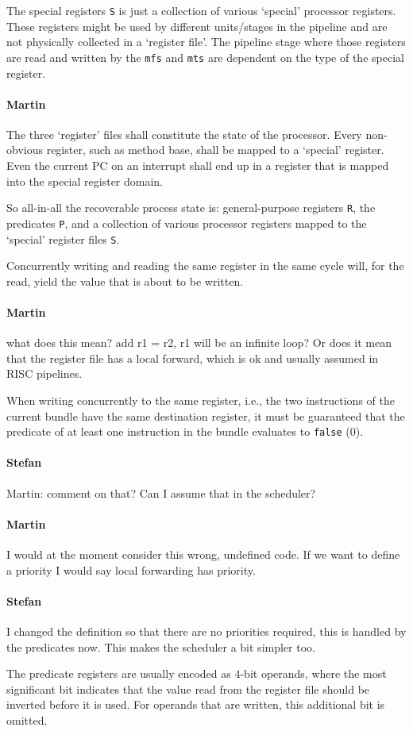 \documentclass{IEEEtran}
\newcommand{\code}[1]{{\texttt{#1}}}
\newcommand{\comment}[3]{\paragraph*{\textbf{#1}}{\color{#3}#2}}
\newcommand{\martin}[1]{\comment{Martin}{#1}{Blue}}
\newcommand{\stefan}[1]{\comment{Stefan}{#1}{RoyalPurple}}
\begin{document}
The special registers \code{S} is just a collection of various `special'
processor registers. These registers might be used by different units/stages
in the pipeline and are not physically collected in a `register file'.
The pipeline stage where those registers are read and written by the
\code{mfs} and \code{mts} are dependent on the type of the special
register.

\martin{The three `register' files shall constitute the state of the processor.
Every non-obvious register, such as method base, shall be mapped to a
`special' register. Even the current PC on an interrupt shall end up in a
register that is mapped into the special register domain.}

So all-in-all the recoverable process state is: general-purpose registers
\code{R}, the predicates \code{P}, and a collection of various processor
registers mapped to the `special' register files \code{S}.

Concurrently writing and reading the same register in the same cycle will, for
the read, yield the value that is about to be written.
\martin{what does this mean? add r1 = r2, r1 will be an infinite loop?
Or does it mean that the register file has a local forward, which is ok and
usually assumed in RISC pipelines.}

When writing concurrently to the same register, i.e., the two instructions of
the current bundle have the same destination register, 
it must be guaranteed that the predicate of at least one instruction in the bundle
evaluates to \texttt{false} (0).
\stefan{Martin: comment on that? Can I assume that in the scheduler?}
\martin{I would at the moment consider this wrong, undefined code.
If we want to define a priority I would say local forwarding has priority.}
\stefan{I changed the definition so that there are no priorities required, this is handled by the predicates now. This makes the
scheduler a bit simpler too.}

The predicate registers are usually encoded as $4$-bit operands, where the most
significant bit indicates that the value read from the register file should be
inverted before it is used. For operands that are written, this additional bit
is omitted.
\end{document}
